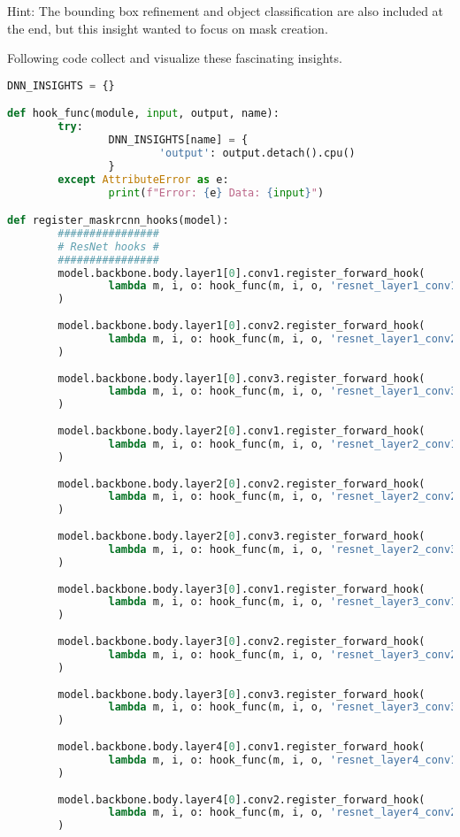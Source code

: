 	\FloatBarrier
	
	Hint: The bounding box refinement and object classification are also included at the end, but this insight wanted to focus on mask creation.
	
	
	Following code collect and visualize these fascinating insights.

	\begin{lstlisting}[language=Python,caption=Hooking insight informations from Mask R-CNN, label=lst:inference-insight]
DNN_INSIGHTS = {}

def hook_func(module, input, output, name):
		try:
				DNN_INSIGHTS[name] = {
						'output': output.detach().cpu()
				}
		except AttributeError as e:
				print(f"Error: {e} Data: {input}")

def register_maskrcnn_hooks(model):
		################
		# ResNet hooks #
		################
		model.backbone.body.layer1[0].conv1.register_forward_hook(
				lambda m, i, o: hook_func(m, i, o, 'resnet_layer1_conv1')
		)
		
		model.backbone.body.layer1[0].conv2.register_forward_hook(
				lambda m, i, o: hook_func(m, i, o, 'resnet_layer1_conv2')
		)
		
		model.backbone.body.layer1[0].conv3.register_forward_hook(
				lambda m, i, o: hook_func(m, i, o, 'resnet_layer1_conv3')
		)
		
		model.backbone.body.layer2[0].conv1.register_forward_hook(
				lambda m, i, o: hook_func(m, i, o, 'resnet_layer2_conv1')
		)
		
		model.backbone.body.layer2[0].conv2.register_forward_hook(
				lambda m, i, o: hook_func(m, i, o, 'resnet_layer2_conv2')
		)
		
		model.backbone.body.layer2[0].conv3.register_forward_hook(
				lambda m, i, o: hook_func(m, i, o, 'resnet_layer2_conv3')
		)
		
		model.backbone.body.layer3[0].conv1.register_forward_hook(
				lambda m, i, o: hook_func(m, i, o, 'resnet_layer3_conv1')
		)
		
		model.backbone.body.layer3[0].conv2.register_forward_hook(
				lambda m, i, o: hook_func(m, i, o, 'resnet_layer3_conv2')
		)
		
		model.backbone.body.layer3[0].conv3.register_forward_hook(
				lambda m, i, o: hook_func(m, i, o, 'resnet_layer3_conv3')
		)
		
		model.backbone.body.layer4[0].conv1.register_forward_hook(
				lambda m, i, o: hook_func(m, i, o, 'resnet_layer4_conv1')
		)
		
		model.backbone.body.layer4[0].conv2.register_forward_hook(
				lambda m, i, o: hook_func(m, i, o, 'resnet_layer4_conv2')
		)
		

\end{lstlisting}
